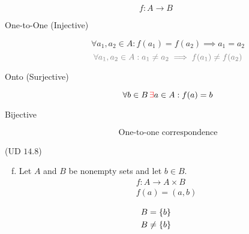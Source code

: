 \begin{frame}{}
  \[
    f: A \to B
  \]
  \begin{description}
    \item[One-to-One (Injective)] 
      \[
	\forall a_1, a_2 \in A: f(a_1) = f(a_2) \implies a_1 = a_2 
      \]
      \[
	\textcolor{gray}{\forall a_1, a_2 \in A: a_1 \neq a_2 \implies f(a_1) \neq f(a_2)}
      \]
    \item[Onto (Surjective)]
      \[
	\forall b \in B \, \textcolor{red}{\exists} a \in A: f(a) = b
      \]
    \item[Bijective] 
      \[
	\text{One-to-one correspondence}
      \]
  \end{description}
\end{frame}

\begin{frame}{}
  \begin{exampleblock}{(UD $14.8$)}
    \begin{enumerate}[(a)]
      \setcounter{enumi}{5}
    \item Let $A$ and $B$ be nonempty sets and let $b \in B$.
      \begin{align*}
	&f : A \to A \times B \\
	&f(a) = (a,b)
      \end{align*}
    \end{enumerate}
  \end{exampleblock}

  \pause
  \begin{align*}
    B &= \{b\}  \\
    B &\neq \{b\}
  \end{align*}
\end{frame}
